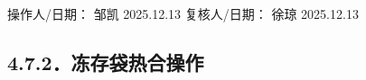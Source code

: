 \documentclass[UTF8,10pt,a4paper,fontset=fandol]{ctexart}
\newcommand{\fieldvalue}[1]{#1}
\newcommand{\handwritten}[1]{#1}
\begin{document}
\vspace{0.3em}

操作人/日期：
\fieldvalue{\handwritten{邹凯}}
\quad
\fieldvalue{\handwritten{2025.12.13}}
\qquad
复核人/日期：
\fieldvalue{\handwritten{徐琼}}
\quad
\fieldvalue{\handwritten{2025.12.13}}

\subsection*{4.7.2．冻存袋热合操作}
\end{document}

